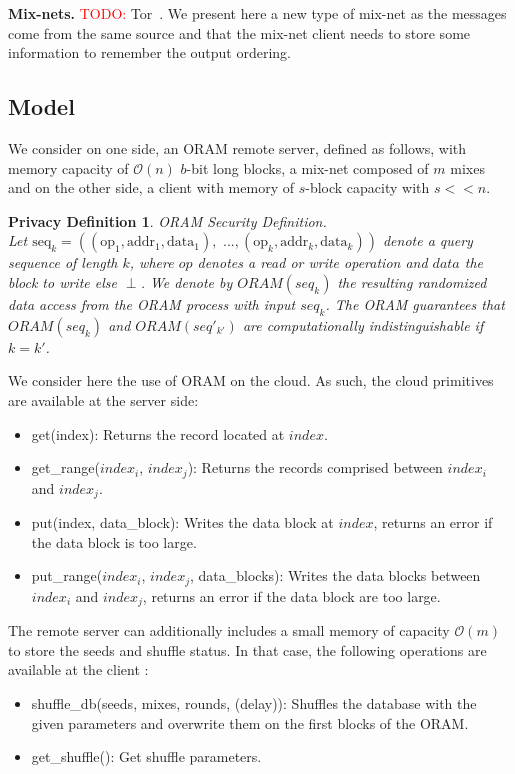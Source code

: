 \documentclass{llncs}
\newtheorem{privdef}{Privacy Definition}
\newcommand{\todo}[1]{\textcolor{red}{TODO: #1}}
\begin{document}
\noindent\textbf{Mix-nets.}
\todo{} Tor~\cite{dingledine2004tor}. 
We present here a new type of mix-net as the messages come from the same source and that the mix-net client needs to store some information to remember the output ordering.

\subsection{Model}\label{Model}
We consider on one side, an ORAM remote server, defined as follows, with memory capacity of $\mathcal{O}\left(n\right)$ $b$-bit long blocks, a mix-net composed of $m$ mixes and on the other side, a client with memory of $s$-block capacity with $s<<n$.
%
\begin{privdef}{ORAM Security Definition.}\\
Let $\text{seq}_k=((\text{op}_1, \text{addr}_1, \text{data}_1), \text{ ...},(\text{op}_k, \text{addr}_k, \text{data}_k))$ denote a query sequence of length $k$, where $op$ denotes a read or write operation and $data$ the block to write else $
\perp$.
We denote by $ORAM(seq_k)$ the resulting randomized data access from the ORAM process with input $seq_k$.
The ORAM guarantees that $ORAM(seq_k)$ and $ORAM(seq'_{k'})$ are computationally indistinguishable if $k=k'$.
\end{privdef}

We consider here the use of ORAM on the cloud. As such, the cloud primitives are available at the server side:
\begin{itemize}
 \item get(index): Returns the record located at $index$.
 \item get\_range($index_i$, $index_j$): Returns the records comprised between $index_i$ and $index_j$.
 \item put(index, data\_block):  Writes the data block at $index$, returns an error if the data block is too large.
 \item put\_range($index_i$, $index_j$, data\_blocks): Writes the data blocks between $index_i$ and $index_j$, returns an error if the data block are too large.
\end{itemize}

The remote server can additionally includes a small memory of capacity $\mathcal{O}(m)$ to store the seeds and shuffle status. In that case, the following operations are available at the client :
\begin{itemize}
 \item shuffle\_db(seeds, mixes, rounds, (delay)): Shuffles the database with the given parameters and overwrite them on the first blocks of the ORAM.
 \item get\_shuffle(): Get shuffle parameters.
\end{itemize}
%
\end{document}
